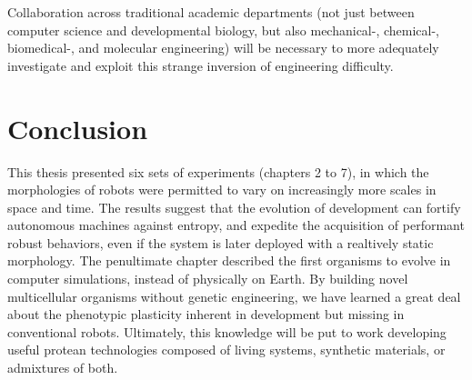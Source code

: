 Collaboration across traditional academic departments
(not just between computer science and developmental biology, but also mechanical-, chemical-, biomedical-, and molecular engineering)
will be necessary
to more adequately investigate and exploit this strange inversion of engineering difficulty.




\section{Conclusion}

This thesis presented six sets of experiments (chapters 2 to 7), in which the morphologies of robots were permitted to vary on increasingly more scales in space and time.
The results suggest that the evolution of development can 
fortify autonomous machines against entropy,
and
expedite the acquisition of performant robust behaviors,
even if the system is later deployed with a realtively static morphology.
The penultimate chapter described the first organisms to evolve in computer simulations, instead of physically on Earth.
By building novel multicellular organisms without genetic engineering, we have learned a great deal about the phenotypic plasticity inherent in development but missing in conventional robots.
Ultimately, this knowledge will be put to work developing useful protean technologies composed of living systems, synthetic materials, or admixtures of both.



\nocite{kriegman2017minimal,kriegman2018morphological, kriegman2018interoceptive,kriegman2019automated,kriegman2019why, kriegman2020sim2real4designs,kriegman2020xenobots}


